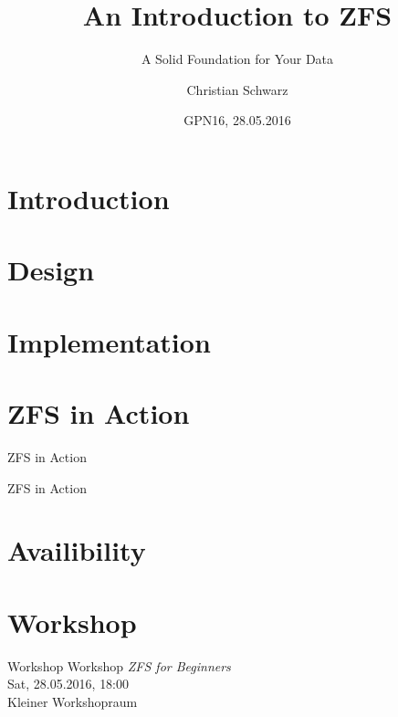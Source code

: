 \documentclass[aspectratio=1610]{beamer}
\begin{document}
\title{An Introduction to ZFS}
\subtitle{A Solid Foundation for Your Data}
\author{Christian Schwarz}
\date{GPN16, 28.05.2016}
\maketitle
%

\section{Introduction}


\section{Design}


\section{Implementation}


\section{ZFS in Action}
\begin{frame}{ZFS in Action}
	\begin{center}
		\Huge ZFS in Action
	\end{center}
\end{frame}
%

\section{Availibility}


\section{Workshop}
\begin{frame}{Workshop}
	\centering
	\huge
	Workshop \textit{ZFS for Beginners} \\
	Sat, 28.05.2016, \alert{18:00} \\
	Kleiner Workshopraum
\end{frame}
\end{document}
